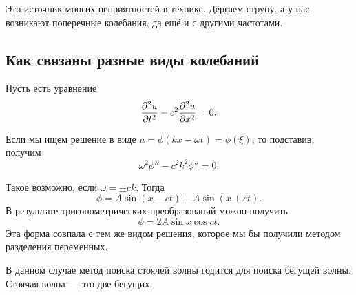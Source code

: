 Это источник многих неприятностей в технике. Дёргаем струну, а у нас возникают поперечные колебания, да ещё и с другими частотами.

\subsection{Как связаны разные виды колебаний}
Пусть есть уравнение
\[
  \frac{\partial ^2u}{\partial t^2} - c^2\frac{\partial ^2u}{\partial x^2} = 0.
\]

Если мы ищем решение в виде $u = \phi(kx - \omega t) = \phi(\xi)$, то подставив, получим
\[
  \omega^2 \phi'' - c^2k^2\phi'' = 0.
\]

Такое возможно, если $\omega = \pm ck$. Тогда
\[
  \phi = A \sin(x - ct) + A \sin(x + ct).
\]
В результате тригонометрических преобразований можно получить
\[
  \phi = 2A\sin x\cos ct.
\]
Эта форма совпала с тем же видом решения, которое мы бы получили методом разделения переменных.

В данном случае метод поиска стоячей волны годится для поиска бегущей волны.
Стоячая волна --- это две бегущих.
